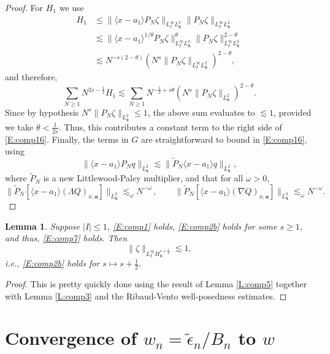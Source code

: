 \documentclass[12pt,letterpaper]{amsart}
\newcommand{\la}{\langle}
\newcommand{\ra}{\rangle}
\newtheorem{lemma}[theorem]{Lemma}
\theoremstyle{remark}
\numberwithin{equation}{section}
\numberwithin{theorem}{section}
\numberwithin{table}{section}
\begin{document}
\begin{proof}
For $H_1$ we use
\begin{align*}
H_1 &\leq \|\la x-a_1 \ra P_N \zeta \|_{L_I^\infty L_{\mathbf{x}}^2} \|P_N \zeta \|_{L_I^\infty L_{\mathbf{x}}^2} \\
& \lesssim \| \la x-a_1 \ra^{1/\theta} P_N \zeta \|_{L_I^\infty L_{\mathbf{x}}^2}^\theta \|P_N \zeta \|_{L_I^\infty L_\mathbf{x}^2}^{2-\theta} \\
& \lesssim  N^{-s(2-\theta)} ( N^s \|P_N \zeta \|_{L_I^\infty L_{\mathbf{x}}^2})^{2-\theta},
\end{align*}
and therefore,
$$
\sum_{N \geq 1} N^{2s-\frac12} H_1  \lesssim \sum_{N \geq 1} N^{-\frac12 + s\theta} ( N^s \|P_N \zeta \|_{L_{\mathbf{x}}^2} )^{2-\theta}.
$$
Since by hypothesis $N^s \|P_N \zeta \|_{L_{\mathbf{x}}^2} \leq 1$, the above sum evaluates to $\lesssim 1$, provided we take $\theta< \frac{1}{2s}$. Thus, this contributes a constant term to the right side of \eqref{E:comp16}.  Finally, the terms in $G$ are straightforward to bound in \eqref{E:comp16}, using 
$$
\| \la x-a_1 \ra P_N q \|_{L_{\mathbf{x}}^2} \lesssim \|\tilde P_N \la x -a_1 \ra q \|_{L_{\mathbf{x}}^2},
$$
where $\tilde P_N$ is a new Littlewood-Paley multiplier, and that for all $\omega>0$,
$$
\| \tilde P_N [ \la x- a_1 \ra(\Lambda Q)_{x,\mathbf{a}}] \|_{L_{\mathbf{x}}^2} \lesssim_\omega N^{-\omega} \,, \qquad \| \tilde P_N [\la x- a_1 \ra (\nabla Q)_{x,\mathbf{a}}] \|_{L_{\mathbf{x}}^2} \lesssim_\omega N^{-\omega}.
$$ 
\end{proof}

\begin{lemma}
\label{L:comp6}
Suppose  $|I|\leq 1$,  \eqref{E:comp1} holds, \eqref{E:comp2b} holds for some $s\geq 1$, and thus, \eqref{E:comp7} holds.  Then
$$
\| \zeta \|_{L_I^\infty H_{\mathbf{x}}^{s+\frac12}} \lesssim 1,
$$
i.e., \eqref{E:comp2b} holds for $s \mapsto s+\frac12$.
\end{lemma}
\begin{proof}
This is pretty quickly done using the result of Lemma \ref{L:comp5} together with Lemma \ref{L:comp3} and the Ribaud-Vento well-posedness estimates.
\end{proof}

\section{Convergence of $w_n = \tilde \epsilon_n/B_n$ to $w$}
\label{S:convergence}
\end{document}
